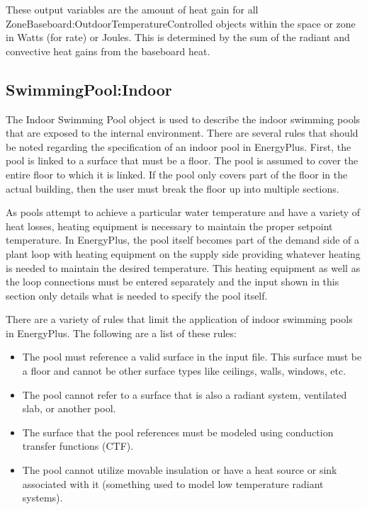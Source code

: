 These output variables are the amount of heat gain for all Zone\-Baseboard:\-Outdoor\-Temperature\-Controlled objects within the space or zone in Watts (for rate) or Joules. This is determined by the sum of the radiant and convective heat gains from the baseboard heat.


\subsection{SwimmingPool:Indoor}\label{swimmingpoolindoor}

The Indoor Swimming Pool object is used to describe the indoor swimming pools that are exposed to the internal environment. There are several rules that should be noted regarding the specification of an indoor pool in EnergyPlus. First, the pool is linked to a surface that must be a floor. The pool is assumed to cover the entire floor to which it is linked. If the pool only covers part of the floor in the actual building, then the user must break the floor up into multiple sections.

As pools attempt to achieve a particular water temperature and have a variety of heat losses, heating equipment is necessary to maintain the proper setpoint temperature. In EnergyPlus, the pool itself becomes part of the demand side of a plant loop with heating equipment on the supply side providing whatever heating is needed to maintain the desired temperature. This heating equipment as well as the loop connections must be entered separately and the input shown in this section only details what is needed to specify the pool itself.

There are a variety of rules that limit the application of indoor swimming pools in EnergyPlus.  The following are a list of these rules:

\begin{itemize}
  \item The pool must reference a valid surface in the input file.  This surface must be a floor and cannot be other surface types like ceilings, walls, windows, etc.
  \item The pool cannot refer to a surface that is also a radiant system, ventilated slab, or another pool.
  \item The surface that the pool references must be modeled using conduction transfer functions (CTF).
  \item The pool cannot utilize movable insulation or have a heat source or sink associated with it (something used to model low temperature radiant systems).
\end{itemize}

